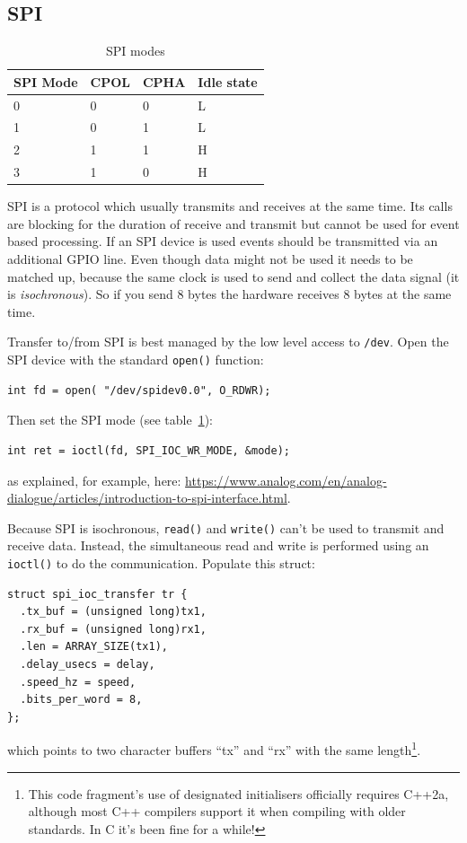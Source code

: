\documentclass[12pt]{report}
\begin{document}
\subsection{SPI}
\begin{table}[!ht]
  \begin{center}
  \caption{SPI modes\label{spimodes}}
  \begin{tabular}{l|l|l|l}
    SPI Mode & 	CPOL & 	CPHA & Idle state \\
    \hline
    0& 	0&	0& 	L \\
    1& 	0&	1& 	L \\
    2& 	1&	1& 	H \\
    3& 	1&	0& 	H \\
  \end{tabular}
  \end{center}
\end{table}
SPI is a protocol which usually transmits and receives at the same
time. Its calls are blocking for the duration of receive and transmit but cannot be used for
event based processing. If an SPI device is used events should be transmitted via an additional
GPIO line. 
Even though data might not be used it needs to be matched up,
because the same clock is used to send and collect the data signal
(it is \emph{isochronous}).
So if you send 8 bytes the hardware receives 8 bytes at the same time.

Transfer to/from SPI is best managed by the low level access to \texttt{/dev}.
Open the SPI device with the standard \texttt{open()} function:
\begin{verbatim}
int fd = open( "/dev/spidev0.0", O_RDWR);
\end{verbatim}

Then set the SPI mode (see table~\ref{spimodes}):
\begin{verbatim}
int ret = ioctl(fd, SPI_IOC_WR_MODE, &mode);
\end{verbatim}
as explained, for example, here:
\url{https://www.analog.com/en/analog-dialogue/articles/introduction-to-spi-interface.html}.

Because SPI is isochronous, \texttt{read()} and \texttt{write()}
can't be used to transmit and receive data. Instead, the simultaneous
read and write is performed using an \texttt{ioctl()} to do the communication.
Populate this struct:
\begin{verbatim}
struct spi_ioc_transfer tr {
  .tx_buf = (unsigned long)tx1,
  .rx_buf = (unsigned long)rx1,
  .len = ARRAY_SIZE(tx1),
  .delay_usecs = delay,
  .speed_hz = speed,
  .bits_per_word = 8,
};
\end{verbatim}
which points to two character buffers ``tx'' and ``rx'' with the
same length\footnote{This code fragment's use of designated initialisers
officially requires C++2a, although most C++ compilers support it
when compiling with older standards. In C it's been fine for a while!}.
\end{document}
